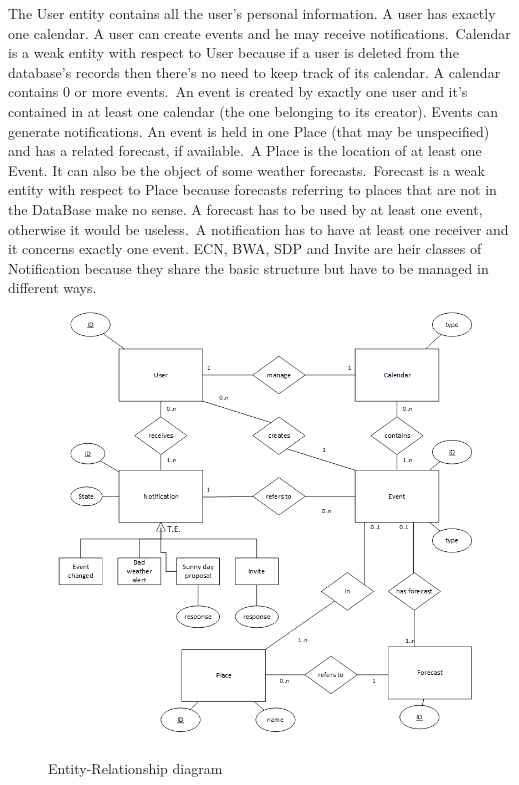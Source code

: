 \documentclass[10pt,a4paper,titlepage]{article}
\begin{document}
The User entity contains all the  user's personal information. A user has exactly one calendar. A user can create events and he may receive notifications.\
Calendar is a weak entity with respect to User because if a user is deleted from the database's records then there's no need  to keep track of its calendar. A calendar contains 0 or more events.\
An event is created by exactly one user and it's contained in at least one calendar (the one belonging to its creator). Events can generate notifications. An event is held in one Place (that may be unspecified) and has a related forecast, if available.\
A Place is the location of at least one Event. It can also be the object of some weather forecasts.\
Forecast is a weak entity with respect to Place because forecasts referring to places that are not in the DataBase make no sense. A forecast has to be used by at least one event, otherwise it would be useless.\
A notification has to have at least one receiver and it concerns exactly one event. ECN, BWA, SDP and Invite are heir classes of Notification because they share the basic structure but have to be managed in different ways.
\begin{figure}[p]
\centering
\includegraphics[width=\linewidth]{./images/ER}
\caption[ER]{Entity-Relationship diagram}
\label{fig:ER}
\end{figure}
\end{document}
